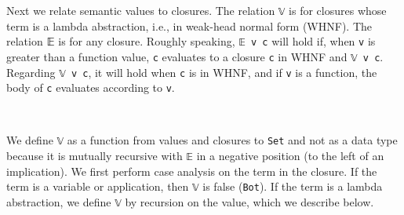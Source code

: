 Next we relate semantic values to closures. The relation \texttt{𝕍} is
for closures whose term is a lambda abstraction, i.e., in weak-head
normal form (WHNF). The relation 𝔼 is for any closure. Roughly speaking,
\texttt{𝔼\ v\ c} will hold if, when \texttt{v} is greater than a
function value, \texttt{c} evaluates to a closure
\texttt{c\textquotesingle{}} in WHNF and
\texttt{𝕍\ v\ c\textquotesingle{}}. Regarding \texttt{𝕍\ v\ c}, it will
hold when \texttt{c} is in WHNF, and if \texttt{v} is a function, the
body of \texttt{c} evaluates according to \texttt{v}.

\begin{fence}
\begin{code}%
\>[0]\AgdaSpace{}%
\AgdaSymbol{:}\AgdaSpace{}%
\AgdaSpace{}%
\AgdaSpace{}%
\AgdaSpace{}%
\AgdaSpace{}%
\<%
\\
\>[0]\AgdaSpace{}%
\AgdaSymbol{:}\AgdaSpace{}%
\AgdaSpace{}%
\AgdaSpace{}%
\AgdaSpace{}%
\AgdaSpace{}%
\<%
\end{code}
\end{fence}

We define \texttt{𝕍} as a function from values and closures to
\texttt{Set} and not as a data type because it is mutually recursive
with \texttt{𝔼} in a negative position (to the left of an implication).
We first perform case analysis on the term in the closure. If the term
is a variable or application, then \texttt{𝕍} is false (\texttt{Bot}).
If the term is a lambda abstraction, we define \texttt{𝕍} by recursion
on the value, which we describe below.

